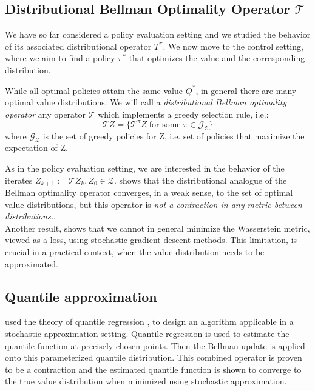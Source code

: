 \subsection{Distributional Bellman Optimality Operator $\mathcal{T}$}
We have so far considered a policy evaluation setting and we studied
the behavior of its associated distributional operator $T^\pi$.
We now move to the control setting, where we aim to find a policy $\pi^{*}$ that optimizes the value and the 
corresponding distribution.

While all optimal policies attain the same value $Q^{*}$, in general there are
many optimal value distributions.
We will call a \textit{distributional Bellman optimality operator} any operator $\mathcal{T}$ 
which implements a greedy selection
rule, i.e.:
\begin{equation*}
    \mathcal{T}Z = \big\{ \mathcal{T}^\pi Z \; \text{for some}\; \pi \in   \mathcal{G_Z} \big\}
\end{equation*}
where $\mathcal{G_Z}$ is the set of greedy policies for Z, i.e. set of policies that maximize
the expectation of Z.

As in the policy evaluation setting, we are interested in the behavior of the iterates 
$Z_{k+1} := \mathcal{T}Z_k, Z_0 \in \mathcal{Z}$.
\citet{Bellemare2017} shows that the distributional analogue of the Bellman optimality operator converges, in a weak sense,
to the set of optimal value distributions, but
this operator is \textit{not a contraction in any metric between distributions.}.\\

Another result, shows that we cannot in general minimize the Wasserstein metric, 
viewed as a loss, using stochastic gradient descent methods. This limitation, is crucial
in a practical context, when the value distribution needs to be approximated.

\subsection{Quantile approximation}
\cite{Dabney2018a} used the theory of quantile regression \cite{koenker2005}, to
design an algorithm applicable in a stochastic approximation setting.
Quantile regression is used to estimate the quantile function at precisely chosen points.
Then the Bellman update is applied onto this parameterized quantile distribution.
This combined operator is proven to be a contraction and the estimated quantile function
is shown to converge to the true value distribution when minimized using stochastic approximation.

